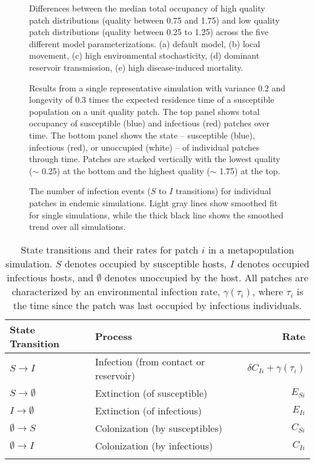 \documentclass{article}
\begin{document}
\begin{figure}
\centering
\caption{Differences between the median total occupancy of high quality patch distributions (quality between 0.75 and 1.75) and low quality patch distributions (quality between 0.25 to 1.25) across the five different model parameterizations. (a) default model, (b) local movement, (c) high environmental stochasticity, (d) dominant reservoir transmission, (e) high disease-induced mortality.}
\label{highvlow}
\end{figure}

\begin{figure}
\centering
\caption{Results from a single representative simulation with variance 0.2 and longevity of 0.3 times the expected residence time of a susceptible population on a unit quality patch.  The top panel shows total occupancy of susceptible (blue) and infectious (red) patches over time.  The bottom panel shows the state -- susceptible (blue), infectious (red), or unoccupied (white) -- of individual patches through time.  Patches are stacked vertically with the lowest quality ($\sim$ 0.25) at the bottom and the highest quality ($\sim$ 1.75) at the top.}
\label{simvis}
\end{figure}


\begin{figure}
\centering
\caption{The number of infection events ($S$ to $I$ transitions) for individual patches in endemic simulations.  Light gray lines show smoothed fit for single simulations, while the thick black line shows the smoothed trend over all simulations.}
\label{infections}
\end{figure}

\clearpage

\begin{table}
\caption{State transitions and their rates for patch $i$ in a metapopulation simulation.  $S$ denotes occupied by  susceptible hosts, $I$ denotes occupied infectious hosts, and $\emptyset$ denotes unoccupied by the host.  All patches are characterized by an environmental infection rate, $\gamma(\tau_i)$, where $\tau_i$ is the time since the patch was last occupied by infectious individuals.}
\begin{tabular}{llr}
State Transition & Process &  Rate \\
\hline
$S \rightarrow I$ & Infection (from contact or reservoir) & $\delta C_{Ii} + \gamma(\tau_i)$\\
$S \rightarrow \emptyset $ & Extinction (of susceptible) & $E_{Si}$\\
$I \rightarrow \emptyset $ & Extinction (of infectious) &  $E_{Ii}$ \\
$\emptyset \rightarrow S$ & Colonization (by susceptibles) & $C_{Si}$\\
$\emptyset \rightarrow I$ & Colonization (by infectious) & $C_{Ii}$\\
\label{transitions}
\end{tabular}
\end{table}
\end{document}
